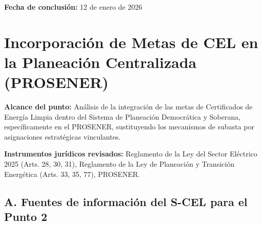\documentclass{cel}
\begin{document}
\textbf{Fecha de conclusión:} 12 de enero de 2026


{}
\section*{Incorporación de Metas de CEL en la Planeación Centralizada (PROSENER)}
\nopagebreak

\textbf{Alcance del punto:} Análisis de la integración de las metas de Certificados de Energía Limpia dentro del Sistema de Planeación Democrática y Soberana, específicamente en el PROSENER, sustituyendo los mecanismos de subasta por asignaciones estratégicas vinculantes.

\textbf{Instrumentos jurídicos revisados:} Reglamento de la Ley del Sector Eléctrico 2025 (Arts. 28, 30, 31), Reglamento de la Ley de Planeación y Transición Energética (Arts. 33, 35, 77), PROSENER.


\vspace{0.4cm}
\subsection{A. Fuentes de información del S-CEL para el Punto 2}
\nopagebreak
\end{document}
